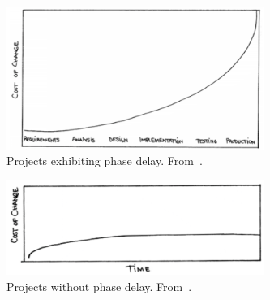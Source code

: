 \documentclass{sig-alternate}
\newcommand{\fig}[1]{Figure~\ref{fig:#1}}
\begin{document}
\begin{figure}
 \includegraphics[width=3.3in]{beckB4.png}
 \caption{Projects exhibiting phase delay. From~\cite{beck00}.}\label{fig:curve1}
 \end{figure}
\begin{figure}
 \includegraphics[width=3.3in]{beckAFTER.png}
 \caption{Projects without   phase delay. From~\cite{beck00}.}\label{fig:curve2}
\end{figure}

\end{document}

